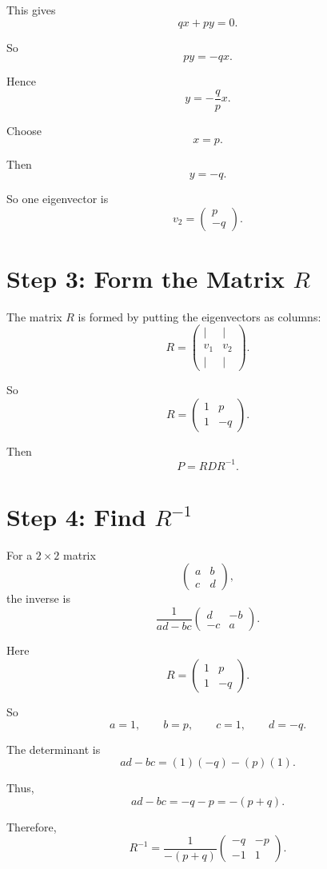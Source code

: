 \documentclass[12pt,a4paper]{article}
\theoremstyle{notestyle}
\begin{document}
This gives
\[
qx+py=0.
\]

So
\[
py=-qx.
\]

Hence
\[
y=-\frac{q}{p}x.
\]

Choose
\[
x=p.
\]

Then
\[
y=-q.
\]

So one eigenvector is
\[
v_2=
\begin{pmatrix}
p\\
-q
\end{pmatrix}.
\]

\section{Step 3: Form the Matrix $R$}

The matrix $R$ is formed by putting the eigenvectors as columns:
\[
R=
\begin{pmatrix}
| & |\\
v_1 & v_2\\
| & |
\end{pmatrix}.
\]

So
\[
R=
\begin{pmatrix}
1 & p\\
1 & -q
\end{pmatrix}.
\]

Then
\[
P=RDR^{-1}.
\]

\section{Step 4: Find $R^{-1}$}

For a $2\times2$ matrix
\[
\begin{pmatrix}
a & b\\
c & d
\end{pmatrix},
\]
the inverse is
\[
\frac{1}{ad-bc}
\begin{pmatrix}
d & -b\\
-c & a
\end{pmatrix}.
\]

Here
\[
R=
\begin{pmatrix}
1 & p\\
1 & -q
\end{pmatrix}.
\]

So
\[
a=1,\qquad b=p,\qquad c=1,\qquad d=-q.
\]

The determinant is
\[
ad-bc=(1)(-q)-(p)(1).
\]

Thus,
\[
ad-bc=-q-p=-(p+q).
\]

Therefore,
\[
R^{-1}
=
\frac{1}{-(p+q)}
\begin{pmatrix}
-q & -p\\
-1 & 1
\end{pmatrix}.
\]
\end{document}
